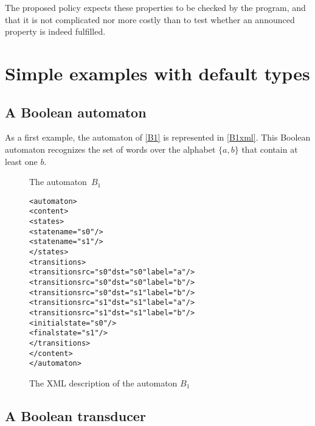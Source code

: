 \documentclass[a4paper]{article}
\newcommand{\medskipneg}{\vspace*{-2ex}} %
\begin{document}
The proposed policy expects these properties to be checked by the
program, and that it is not complicated nor more costly than to test
whether an announced property is indeed fulfilled.

\section{Simple examples with default types}
\subsection{A Boolean automaton}

As a first example, the automaton of \autoref{B1} is represented in
\autoref{B1xml}. This Boolean automaton recognizes the set of words
over the alphabet $\{a,b\}$ that contain at least one $b$.

\begin{figure}[ht]
\begin{center}
\end{center}
\vspace*{-.8cm}
\caption{The automaton~$B_1$}\label{B1}
\medskipneg
\end{figure}

\begin{figure}[ht]
  \small
  \begin{center}
\begin{alltt}
<automaton>
  <content>
    <states>
       <state name="s0"/>
       <state name="s1"/>
    </states>
    <transitions>
       <transition src="s0" dst="s0" label="a"/>
       <transition src="s0" dst="s0" label="b"/>
       <transition src="s0" dst="s1" label="b"/>
       <transition src="s1" dst="s1" label="a"/>
       <transition src="s1" dst="s1" label="b"/>
       <initial state="s0"/>
       <final state="s1"/>
    </transitions>
  </content>
</automaton>
\end{alltt}

\caption{The XML description of the automaton $B_1$}
\label{B1xml}
  \end{center}
\end{figure}

\subsection{A Boolean transducer}
\end{document}
